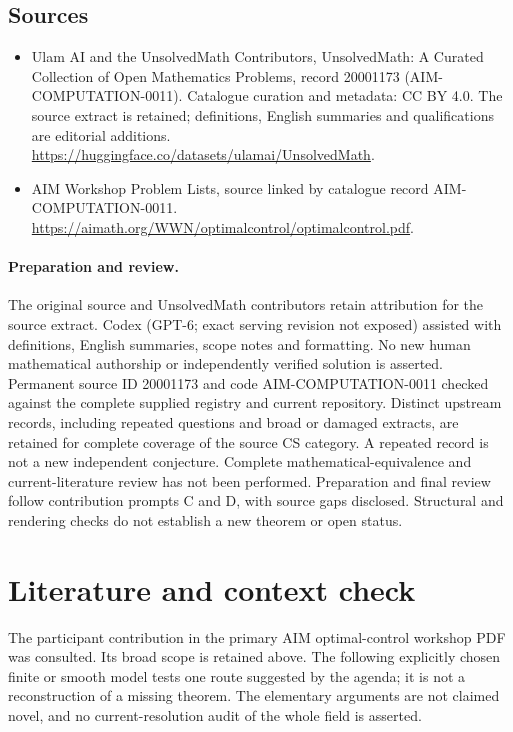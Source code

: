 \documentclass[11pt]{article}
\begin{document}
\subsection{Sources}
\begin{itemize}
\item[S1] Ulam AI and the UnsolvedMath Contributors, UnsolvedMath: A Curated Collection of Open Mathematics Problems, record 20001173 (AIM-COMPUTATION-0011). Catalogue curation and metadata: CC BY 4.0. The source extract is retained; definitions, English summaries and qualifications are editorial additions.
\url{https://huggingface.co/datasets/ulamai/UnsolvedMath}.
\item[S2] AIM Workshop Problem Lists, source linked by catalogue record AIM-COMPUTATION-0011.
\url{https://aimath.org/WWN/optimalcontrol/optimalcontrol.pdf}.
\end{itemize}
\paragraph{Preparation and review.}
The original source and UnsolvedMath contributors retain attribution for the source extract. Codex (GPT-6; exact serving revision not exposed) assisted with definitions, English summaries, scope notes and formatting. No new human mathematical authorship or independently verified solution is asserted. Permanent source ID 20001173 and code AIM-COMPUTATION-0011 checked against the complete supplied registry and current repository. Distinct upstream records, including repeated questions and broad or damaged extracts, are retained for complete coverage of the source CS category. A repeated record is not a new independent conjecture. Complete mathematical-equivalence and current-literature review has not been performed. Preparation and final review follow contribution prompts C and D, with source gaps disclosed. Structural and rendering checks do not establish a new theorem or open status.
\label{end:20001173}

\section{Literature and context check}
The participant contribution in the primary AIM optimal-control workshop
 PDF was consulted. Its broad scope is retained above. The following explicitly
 chosen finite or smooth model tests one route suggested by the agenda; it is
 not a reconstruction of a missing theorem. The elementary arguments are not
 claimed novel, and no current-resolution audit of the whole field is asserted.
\end{document}
